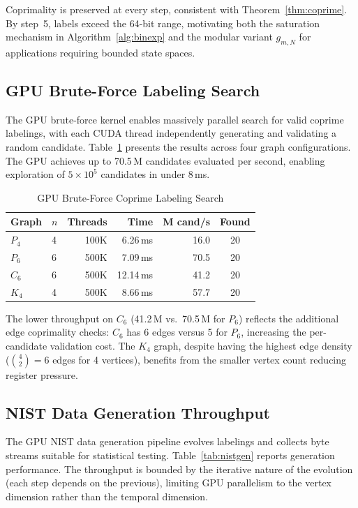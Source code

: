 \documentclass[lettersize,journal]{IEEEtran}
\begin{document}
\noindent Coprimality is preserved at every step, consistent with Theorem~\ref{thm:coprime}. By step~5, labels exceed the 64-bit range, motivating both the saturation mechanism in Algorithm~\ref{alg:binexp} and the modular variant $g_{m,N}$ for applications requiring bounded state spaces.

\subsection{GPU Brute-Force Labeling Search}

The GPU brute-force kernel enables massively parallel search for valid coprime labelings, with each CUDA thread independently generating and validating a random candidate. Table~\ref{tab:bruteforce} presents the results across four graph configurations. The GPU achieves up to 70.5\,M candidates evaluated per second, enabling exploration of $5 \times 10^5$ candidates in under 8\,ms.

\begin{table}[!t]
\caption{GPU Brute-Force Coprime Labeling Search\label{tab:bruteforce}}
\centering
\begin{tabular}{@{}llrrrc@{}}
\toprule
\textbf{Graph} & $n$ & \textbf{Threads} & \textbf{Time} & \textbf{M cand/s} & \textbf{Found} \\
\midrule
$P_4$      & 4 & 100K & 6.26\,ms & 16.0 & 20 \\
$P_6$      & 6 & 500K & 7.09\,ms & 70.5 & 20 \\
$C_6$      & 6 & 500K & 12.14\,ms & 41.2 & 20 \\
$K_4$      & 4 & 500K & 8.66\,ms & 57.7 & 20 \\
\bottomrule
\end{tabular}
\end{table}

\noindent The lower throughput on $C_6$ (41.2\,M vs.\ 70.5\,M for $P_6$) reflects the additional edge coprimality checks: $C_6$ has 6 edges versus 5 for $P_6$, increasing the per-candidate validation cost. The $K_4$ graph, despite having the highest edge density ($\binom{4}{2} = 6$ edges for 4 vertices), benefits from the smaller vertex count reducing register pressure.

\subsection{NIST Data Generation Throughput}

The GPU NIST data generation pipeline evolves labelings and collects byte streams suitable for statistical testing. Table~\ref{tab:nistgen} reports generation performance. The throughput is bounded by the iterative nature of the evolution (each step depends on the previous), limiting GPU parallelism to the vertex dimension rather than the temporal dimension.
\end{document}
